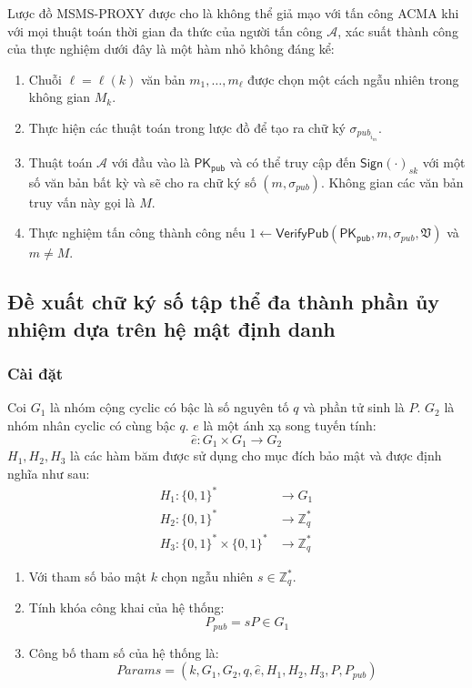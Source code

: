\begin{defi} Lược đồ MSMS-PROXY được cho là không thể giả mạo với tấn công ACMA khi với mọi thuật toán thời gian đa thức của người tấn công $\mathcal{A}$, xác suất thành công của thực nghiệm dưới đây là một hàm nhỏ không đáng kể:
	\begin{enumerate}[label=(\arabic*)]
		\item Chuỗi $\ell=\ell(k)$ văn bản $m_1,\ldots,m_{\ell}$ được chọn một cách ngẫu nhiên trong không gian $M_k$.
		\item Thực hiện các thuật toán trong lược đồ để tạo ra chữ ký $\sigma_{{pub}_{i_m}}$.
		\item Thuật toán $\mathcal{A}$ với đầu vào là $\mathsf{PK_{pub}}$ và có thể truy cập đến $\mathsf{Sign(\cdot)}_{sk}$ với một số văn bản bất kỳ và sẽ cho ra chữ ký số $(m,\sigma_{pub}) $. Không gian các văn bản truy vấn này gọi là $M$.
		\item Thực nghiệm tấn công thành công nếu $1 \gets \boldsymbol{\mathsf{VerifyPub}}(\mathsf{PK_{pub}},m,\sigma_{pub},\mathfrak{V})$ và $m\ne M$.
	\end{enumerate}	
\end{defi}

\subsection{Đề xuất chữ ký số tập thể đa thành phần ủy nhiệm dựa trên hệ mật định danh} \label{muc.uynhiemIDBased}


\subsubsection {Cài đặt}
Coi $G_1$ là nhóm cộng cyclic có bậc là số nguyên tố $q$ và phần tử sinh là $P$. $G_2$ là nhóm nhân cyclic có cùng bậc $q$. $e$ là một ánh xạ song tuyến tính: \[ \hat{e}: G_1 \times G_1 \to G_2 \] $H_1, H_2, H_3$ là các hàm băm được sử dụng cho mục đích bảo mật và được định nghĩa như sau:
\begin{align}
	H_1: \{0,1\}^* & \to G_1 \\
	H_2: \{0,1\}^* & \to \mathbb{Z}_q^* \\
	H_3: \{0,1\}^* \times \{0,1\}^* & \to \mathbb{Z}_q^*
\end{align}


\begin{enumerate}[label=(\arabic*)]
	\item Với tham số bảo mật $k$ chọn ngẫu nhiên $s \in \mathbb{Z}_q^*$.
	\item Tính khóa công khai của hệ thống: \[ P_{pub} = sP \in G_1 \]
	\item Công bố tham số của hệ thống là: \[ Params = (k,G_1,G_2,q,\hat{e},H_1,H_2,H_3, P,P_{pub}) \]
\end{enumerate}	

